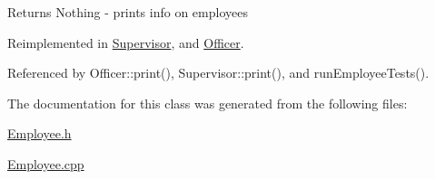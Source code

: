 \begin{DoxyReturn}{Returns}
Nothing -\/ prints info on employees 
\end{DoxyReturn}


Reimplemented in \hyperlink{classSupervisor_a92483dc9a54904d79b46c6ec4efb3f54}{Supervisor}, and \hyperlink{classOfficer_aeadece05a1a0b7fb29bd412830d2e07a}{Officer}.



Referenced by Officer\+::print(), Supervisor\+::print(), and run\+Employee\+Tests().



The documentation for this class was generated from the following files\+:\begin{DoxyCompactItemize}
\item 
\hyperlink{Employee_8h}{Employee.\+h}\item 
\hyperlink{Employee_8cpp}{Employee.\+cpp}\end{DoxyCompactItemize}
